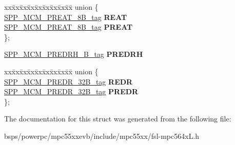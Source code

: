 \begin{DoxyCompactItemize}
\begin{tabbing}
\end{tabbing}\item 
\mbox{\label{structSPP__MCM__struct__tag_a18bedad22a6e6cd715a1482c7be14035}} 
\begin{tabbing}
xx\=xx\=xx\=xx\=xx\=xx\=xx\=xx\=xx\=\kill
union \{\\
\>\mbox{\hyperlink{unionSPP__MCM__PREAT__8B__tag}{SPP\_MCM\_PREAT\_8B\_tag}} {\bfseries REAT}\\
\>\mbox{\hyperlink{unionSPP__MCM__PREAT__8B__tag}{SPP\_MCM\_PREAT\_8B\_tag}} {\bfseries PREAT}\\
\}; \\

\end{tabbing}\item 
\mbox{\label{structSPP__MCM__struct__tag_af10eafe2cf15e730c8b167f4a446c557}} 
\mbox{\hyperlink{unionSPP__MCM__PREDRH__32B__tag}{S\+P\+P\+\_\+\+M\+C\+M\+\_\+\+P\+R\+E\+D\+R\+H\+\_\+B\+\_\+tag}} {\bfseries P\+R\+E\+D\+RH}
\item 
\mbox{\label{structSPP__MCM__struct__tag_ab12d0a1e783170250dd1f1107e1a4abd}} 
\begin{tabbing}
xx\=xx\=xx\=xx\=xx\=xx\=xx\=xx\=xx\=\kill
union \{\\
\>\mbox{\hyperlink{unionSPP__MCM__PREDR__32B__tag}{SPP\_MCM\_PREDR\_32B\_tag}} {\bfseries REDR}\\
\>\mbox{\hyperlink{unionSPP__MCM__PREDR__32B__tag}{SPP\_MCM\_PREDR\_32B\_tag}} {\bfseries PREDR}\\
\}; \\

\end{tabbing}\end{DoxyCompactItemize}


The documentation for this struct was generated from the following file\+:\begin{DoxyCompactItemize}
\item 
bsps/powerpc/mpc55xxevb/include/mpc55xx/fsl-\/mpc564x\+L.\+h\end{DoxyCompactItemize}
